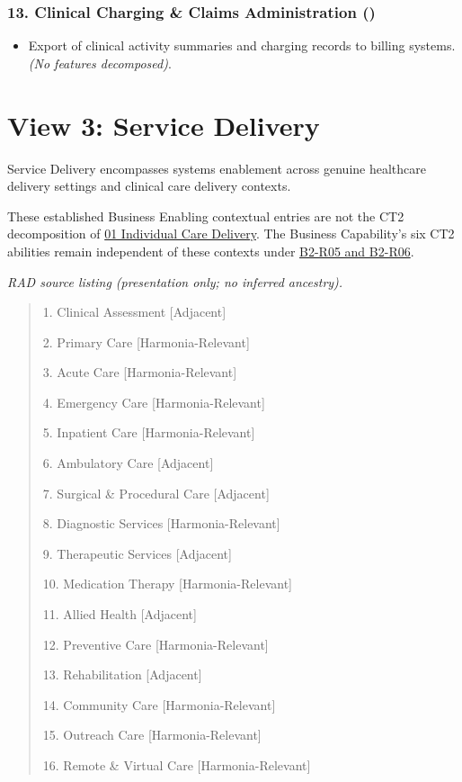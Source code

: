 \subsubsection*{13. Clinical Charging \& Claims Administration (\texttt{})}
\label{rad:enabling:347}

\begin{itemize}

\item
Export of clinical activity summaries and charging records to billing systems. \emph{(No features decomposed)}.



\end{itemize}
\label{rad:enabling:349}

\par\smallskip
{}\label{rad:enabling:351}
\section*{View 3: Service Delivery}
\label{rad:enabling:353}

Service Delivery encompasses systems enablement across genuine healthcare delivery settings and clinical care delivery contexts.

\label{rad:enabling:355}

These established Business Enabling contextual entries are not the CT2 decomposition of \hyperref[rad:business:148]{01 Individual Care Delivery}. The Business Capability's six CT2 abilities remain independent of these contexts under \href{https://github.com/fhirfactory/harmonia/blob/98410db60155198a75f74c79d98060070209faa1/docs/markdown/02-strategy/capabilities/business-capabilities.md\#b2-r05}{B2-R05 and B2-R06}.

\label{rad:enabling:360}

\textit{RAD source listing (presentation only; no inferred ancestry).}
\begin{quote}
1. Clinical Assessment [Adjacent]

2. Primary Care [Harmonia-Relevant]

3. Acute Care [Harmonia-Relevant]

4. Emergency Care [Harmonia-Relevant]

5. Inpatient Care [Harmonia-Relevant]

6. Ambulatory Care [Adjacent]

7. Surgical \& Procedural Care [Adjacent]

8. Diagnostic Services [Harmonia-Relevant]

9. Therapeutic Services [Adjacent]

10. Medication Therapy [Harmonia-Relevant]

11. Allied Health [Adjacent]

12. Preventive Care [Harmonia-Relevant]

13. Rehabilitation [Adjacent]

14. Community Care [Harmonia-Relevant]

15. Outreach Care [Harmonia-Relevant]

16. Remote \& Virtual Care [Harmonia-Relevant]
\end{quote}
\label{rad:enabling:379}

